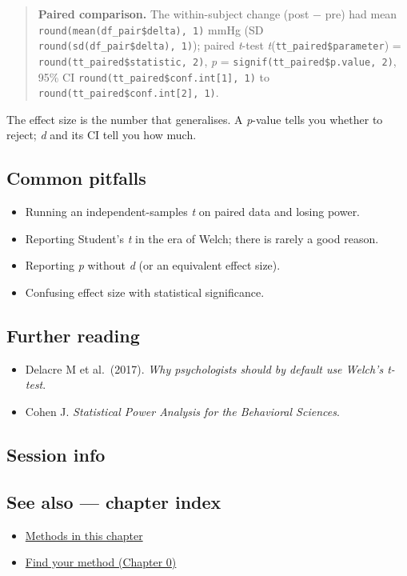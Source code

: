 \documentclass[
]{article}
\newenvironment{Shaded}{\begin{snugshade}}{\end{snugshade}}
\providecommand{\tightlist}{%
  \setlength{\itemsep}{0pt}\setlength{\parskip}{0pt}}
\begin{document}
\begin{quote}
\textbf{Paired comparison.} The within-subject change (post − pre) had
mean \texttt{round(mean(df\_pair\$delta),\ 1)} mmHg (SD
\texttt{round(sd(df\_pair\$delta),\ 1)}); paired \emph{t}-test
\emph{t}(\texttt{tt\_paired\$parameter}) =
\texttt{round(tt\_paired\$statistic,\ 2)}, \emph{p} =
\texttt{signif(tt\_paired\$p.value,\ 2)}, 95\% CI
\texttt{round(tt\_paired\$conf.int{[}1{]},\ 1)} to
\texttt{round(tt\_paired\$conf.int{[}2{]},\ 1)}.
\end{quote}

The effect size is the number that generalises. A \emph{p}-value tells
you whether to reject; \emph{d} and its CI tell you how much.

\subsection{Common pitfalls}\label{common-pitfalls}

\begin{itemize}
\tightlist
\item
  Running an independent-samples \emph{t} on paired data and losing
  power.
\item
  Reporting Student's \emph{t} in the era of Welch; there is rarely a
  good reason.
\item
  Reporting \emph{p} without \emph{d} (or an equivalent effect size).
\item
  Confusing effect size with statistical significance.
\end{itemize}

\subsection{Further reading}\label{further-reading}

\begin{itemize}
\tightlist
\item
  Delacre M et al.~(2017). \emph{Why psychologists should by default use
  Welch's t-test}.
\item
  Cohen J. \emph{Statistical Power Analysis for the Behavioral
  Sciences}.
\end{itemize}

\subsection{Session info}\label{session-info}

\begin{Shaded}
\begin{Highlighting}[]

\end{Highlighting}
\end{Shaded}

\subsection{See also --- chapter index}\label{see-also-chapter-index}

\begin{itemize}
\tightlist
\item
  \href{../index.Rmd}{Methods in this chapter}
\item
  \href{../../../ch00-find-your-method.Rmd}{Find your method (Chapter
  0)}
\end{itemize}
\end{document}
